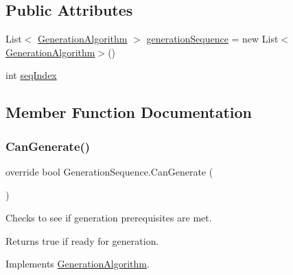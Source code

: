 \subsection*{Public Attributes}
\begin{DoxyCompactItemize}
\item 
List$<$ \mbox{\hyperlink{class_generation_algorithm}{Generation\+Algorithm}} $>$ \mbox{\hyperlink{class_generation_sequence_a4e4b450952479c6d089c47ad514f15ae}{generation\+Sequence}} = new List$<$\mbox{\hyperlink{class_generation_algorithm}{Generation\+Algorithm}}$>$()
\item 
int \mbox{\hyperlink{class_generation_sequence_ad8f5b50dde07c78b79462dcd23b7cfde}{seq\+Index}}
\end{DoxyCompactItemize}


\subsection{Member Function Documentation}
\mbox{\label{class_generation_sequence_a33000b1383e18a453a592ed05a9e5e56}} 
\subsubsection{\texorpdfstring{Can\+Generate()}{CanGenerate()}}
{\footnotesize\ttfamily override bool Generation\+Sequence.\+Can\+Generate (\begin{DoxyParamCaption}{ }\end{DoxyParamCaption})\hspace{0.3cm}{\ttfamily [virtual]}}



Checks to see if generation prerequisites are met. 

\begin{DoxyReturn}{Returns}
true if ready for generation.
\end{DoxyReturn}


Implements \mbox{\hyperlink{class_generation_algorithm_af7d03e24e3b7fecfe2ae43f06915986d}{Generation\+Algorithm}}.

\mbox{\label{class_generation_sequence_ac594b809365f2af5e423bfd5830b796a}} 
